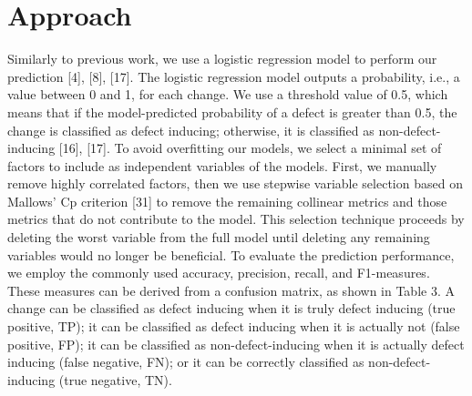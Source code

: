 \documentclass[10pt, conference]{IEEEtran}
\begin{document}
\section{Approach}
\label{sec:approach}
Similarly to previous work, we use a logistic regression model to perform our prediction [4], [8], [17]. The logistic regression model outputs a probability, i.e., a value between 0 and 1, for each change. We use a threshold value of 0.5, which means that if the model-predicted probability of a defect is greater than 0.5, the change is classified as defect inducing; otherwise, it is classified as non-defect-inducing [16], [17]. To avoid overfitting our models, we select a minimal set of factors to include as independent variables of the models. First, we manually remove highly correlated factors, then we use stepwise variable selection based on Mallows’ Cp criterion [31] to remove the remaining collinear metrics and those metrics that do not contribute to the model. This selection technique proceeds by deleting the worst variable from the full model until deleting any remaining variables would no longer be beneficial. To evaluate the prediction performance, we employ the commonly used accuracy, precision, recall, and F1-measures. These measures can be derived from a confusion matrix, as shown in Table 3. A change can be classified as defect inducing when it is truly defect inducing (true positive, TP); it can be classified as defect inducing when it is actually not (false positive, FP); it can be classified as non-defect-inducing when it is actually defect inducing (false negative, FN); or it can be correctly classified as non-defect-inducing (true negative, TN).
\onecolumn
\end{document}
